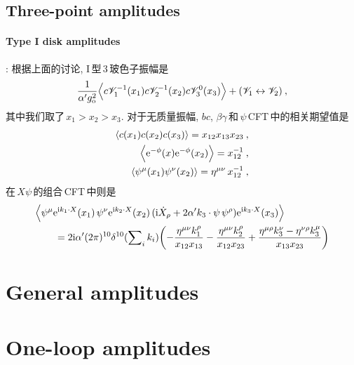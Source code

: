 \subsection*{Three-point amplitudes}

\paragraph{Type I disk amplitudes}: 根据上面的讨论, I\,型\,3\,玻色子振幅是
\begin{equation}
    \frac{1}{\alpha^{\prime}g_{\mathrm{o}}^{2}}\Bigl\langle c\mathscr{V}_{1}^{-1}(x_{1})c\mathscr{V}^{-1}_{2}(x_{2})
    c\mathscr{V}_{3}^{0}(x_{3}) \Bigr\rangle + (\mathscr{V}_{1}\leftrightarrow\mathscr{V}_{2})\:, \label{12.4.1}
\end{equation}
其中我们取了$\,x_{1}>x_{2}>x_{3}$. 对于无质量振幅, $bc$, $\beta\gamma$\,和$\,\psi\,$CFT\,中的相关期望值是
\begin{subequations}
\begin{align}
    \langle c(x_{1})c(x_{2})c(x_{3})\rangle =x_{12}x_{13}x_{23} \:, \label{12.4.2a} \\
    \Bigl\langle \mathrm{e}^{-\phi}(x)\mathrm{e}^{-\phi}(x_{2})\Bigr\rangle = x_{12}^{-1} \:, \label{12.4.2b} \\
    \langle \psi^{\mu}(x_{1})\psi^{\nu}(x_{2})\rangle =\eta^{\mu\nu}\,x_{12}^{-1} \:, \label{12.4.2c}
\end{align} \label{12.4.2}
\end{subequations}
在$\,X\psi\,$的组合\,CFT\,中则是
\begin{align}
    &\Bigl\langle \psi^{\mu}\mathrm{e}^{\mathrm{i} k_{1}\cdot X}(x_{1})\,\psi^{\nu}\mathrm{e}^{\mathrm{i} k_{2}\cdot X}(x_{2})\,
    (\mathrm{i} \dot{X}_{\rho}+2\alpha^{\prime}k_{3}\cdot\psi\,\psi^{\rho})\mathrm{e}^{\mathrm{i} k_{3}\cdot X}(x_{3})\Bigr\rangle \nonumber\\
    &\qquad=2\mathrm{i}\alpha^{\prime}(2\pi)^{10}\delta^{10}(\sum\nolimits_{i}k_{i})
    \biggl(-\frac{\eta^{\mu\nu}k_{1}^{\rho}}{x_{12}x_{13}}-\frac{\eta^{\mu\nu}k_{2}^{\rho}}{x_{12}x_{23}}
    +\frac{\eta^{\mu\rho}k_{3}^{\nu}-\eta^{\nu\rho}k_{3}^{\mu}}{x_{13}x_{23}}\biggr) \label{12.4.3}
\end{align}


\section{General amplitudes}

\section{One-loop amplitudes}